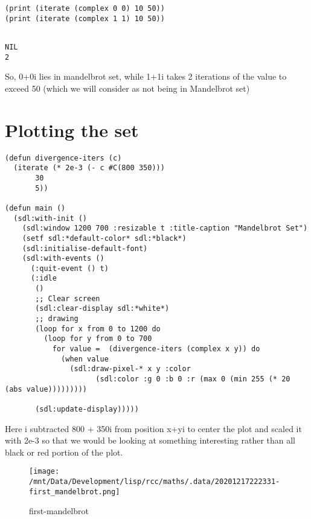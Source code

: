 \documentclass[11pt,a4paper]{article}
\begin{document}
\begin{lstlisting}
(print (iterate (complex 0 0) 10 50))
(print (iterate (complex 1 1) 10 50))
\end{lstlisting}

\begin{verbatim}

NIL 
2 
\end{verbatim}


So, 0+0i lies in mandelbrot set, while 1+1i takes 2 iterations of the value to exceed 50 (which we will consider as not being in Mandelbrot set)

\section{Plotting the set}
\label{sec:org1ebf3ec}
\begin{lstlisting}
(defun divergence-iters (c)
  (iterate (* 2e-3 (- c #C(800 350)))
	   30
	   5))

(defun main ()
  (sdl:with-init ()
    (sdl:window 1200 700 :resizable t :title-caption "Mandelbrot Set")
    (setf sdl:*default-color* sdl:*black*)
    (sdl:initialise-default-font)
    (sdl:with-events ()
      (:quit-event () t)
      (:idle
       ()
       ;; Clear screen
       (sdl:clear-display sdl:*white*)
       ;; drawing
       (loop for x from 0 to 1200 do
	     (loop for y from 0 to 700
		   for value =  (divergence-iters (complex x y)) do
		     (when value 
		       (sdl:draw-pixel-* x y :color
					 (sdl:color :g 0 :b 0 :r (max 0 (min 255 (* 20 (abs value)))))))))

       (sdl:update-display)))))
\end{lstlisting}

Here i subtracted 800 + 350i from position x+yi to center the plot and scaled it with 2e-3 so that we would be looking at something interesting rather than all black or red portion of the plot. 

\begin{figure}[htbp]
\centering
\texttt{[image: /mnt/Data/Development/lisp/rcc/maths/.data/20201217222331-first\_mandelbrot.png]}
\caption{first-mandelbrot}
\end{figure}
\end{document}
